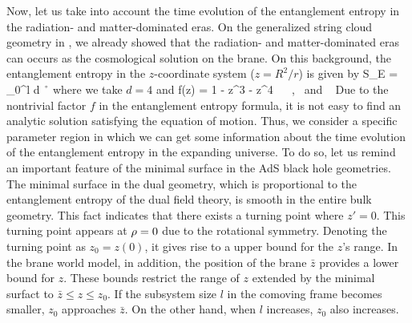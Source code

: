 \documentclass[12pt]{article}
\begin{document}
Now, let us take into account the time evolution of the entanglement entropy in the radiation- and matter-dominated eras. On the generalized string cloud geometry in , we already showed that the radiation- and matter-dominated eras can occurs as the cosmological solution on  the brane. On this background, the entanglement entropy in the $z$-coordinate system ($ z = R^2 / r$) is given by
\be
S_E =  \int_0^l d \r \   
\ee
where we take $d=4$ and 
\be
f(z) = 1  - \td{\r} z^3  - z^4   \ \  \td{\r} \equiv {} , \ {\rm and} \  \equiv {} 
\ee
Due to the nontrivial factor $f$ in the entanglement entropy formula, it is not  easy to find an analytic solution satisfying the equation of motion. Thus, we consider a specific parameter region in which we can get some information about the time evolution of the entanglement entropy in the expanding universe. To do so, let us remind an important feature of the minimal surface in the AdS black hole geometries. The minimal surface in the dual geometry, which is proportional to the entanglement entropy of the dual field theory, is smooth in the entire bulk geometry. This fact indicates that there exists a turning point where $z' = 0$. This turning point appears at $\rho=0$ due to the rotational symmetry. Denoting the turning point as $z_0 = z(0)$, it gives rise to a upper bound for the $z$'s range. In the brane world model, in addition, the position of the brane $\bar{z}$ provides a lower bound for $z$. These bounds restrict the range of $z$ extended by the minimal surfact to $\bar{z} \le z \le z_0$. If the subsystem size $l$ in the comoving frame becomes smaller, $z_0$ approaches $\bar{z}$. On the other hand, when $l$ increases, $z_0$ also increases.
\end{document}
